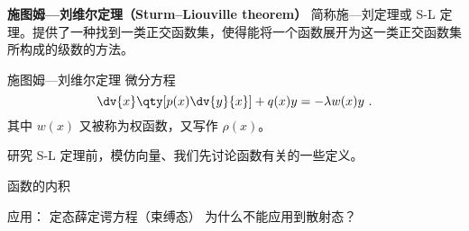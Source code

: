 
\begin{issues}
\issueDraft
\end{issues}


\textbf{施图姆—刘维尔定理（Sturm–Liouville theorem）} 简称施—刘定理或 S-L 定理。提供了一种找到一类正交函数集，使得能将一个函数展开为这一类正交函数集所构成的级数的方法。

\begin{theorem}{施图姆—刘维尔定理}
微分方程
\begin{equation}
\dv{x}\qty[p(x)\dv{y}{x}] + q(x) y = -\lambda w(x) y~.
\end{equation}
其中 $w(x)$ 又被称为权函数，又写作 $\rho(x)$。
\end{theorem}

研究 S-L 定理前，模仿向量、我们先讨论函数有关的一些定义。
\begin{definition}{函数的内积}

\end{definition}
 
应用： 定态薛定谔方程（束缚态） 为什么不能应用到散射态？
